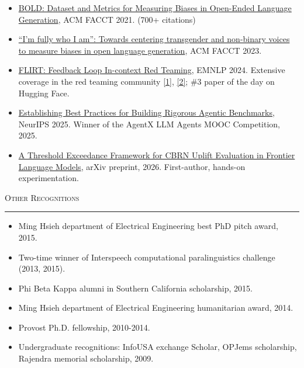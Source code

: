 \documentclass[11pt]{article}
\newcommand{\sectionheading}[1]{%
  \vspace{8pt}%
  {\large\scshape #1}\par\vspace{1pt}\hrule\vspace{3pt}%
}
\begin{document}
\begin{itemize}
  \item \href{https://arxiv.org/abs/2101.11718}{BOLD: Dataset and Metrics for Measuring Biases in Open-Ended Language Generation}, ACM FACCT 2021. {\color{gray}(700+ citations)}
  \item \href{https://arxiv.org/abs/2305.09941}{``I'm fully who I am'': Towards centering transgender and non-binary voices to measure biases in open language generation}, ACM FACCT 2023.
  \item \href{https://arxiv.org/abs/2308.04265}{FLIRT: Feedback Loop In-context Red Teaming}, EMNLP 2024. {\color{gray}Extensive coverage in the red teaming community \href{https://lilianweng.github.io/posts/2023-10-25-adv-attack-llm/}{[1]}, \href{https://huggingface.co/papers/2308.04265}{[2]}; \#3 paper of the day on Hugging Face.}
  \item \href{https://arxiv.org/abs/2507.02825}{Establishing Best Practices for Building Rigorous Agentic Benchmarks}, NeurIPS 2025. {\color{gray}Winner of the AgentX LLM Agents MOOC Competition, 2025.}
  \item \href{https://arxiv.org/abs/2607.12200}{A Threshold Exceedance Framework for CBRN Uplift Evaluation in Frontier Language Models}, arXiv preprint, 2026. {\color{gray}First-author, hands-on experimentation.}
\end{itemize}

\sectionheading{Other Recognitions}
\begin{itemize}
  \item Ming Hsieh department of Electrical Engineering best PhD pitch award, 2015.
  \item Two-time winner of Interspeech computational paralinguistics challenge (2013, 2015).
  \item Phi Beta Kappa alumni in Southern California scholarship, 2015.
  \item Ming Hsieh department of Electrical Engineering humanitarian award, 2014.
  \item Provost Ph.D. fellowship, 2010-2014.
  \item Undergraduate recognitions: InfoUSA exchange Scholar, OPJems scholarship, Rajendra memorial scholarship, 2009.
\end{itemize}
\end{document}
